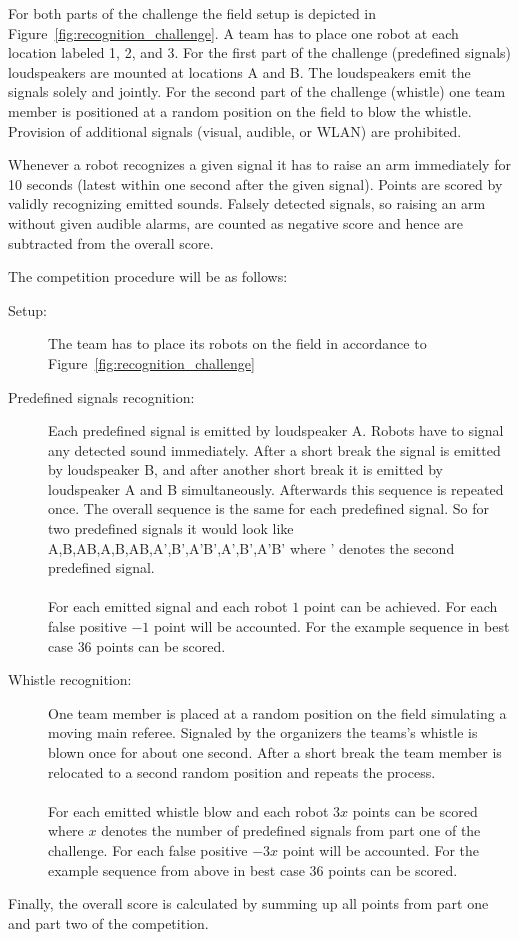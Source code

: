 \documentclass[12pt]{article}
\begin{document}
For both parts of the challenge the field setup is depicted in Figure~\ref{fig:recognition_challenge}. A team has to place one robot at each location labeled 1, 2, and 3. For the first part of the challenge (predefined signals) loudspeakers are mounted at locations A and B. The loudspeakers emit the signals solely and jointly. For the second part of the challenge (whistle) one team member is positioned at a random position on the field to blow the whistle. Provision of additional signals (visual, audible, or WLAN) are prohibited.

Whenever a robot recognizes a given signal it has to raise an arm immediately for 10 seconds (latest within one second after the given signal).
Points are scored by validly recognizing emitted sounds. Falsely detected signals, so raising an arm without given audible alarms, are counted as negative score and hence are subtracted from the overall score.

The competition procedure will be as follows:

\begin{description}
	\item[Setup:] The team has to place its robots on the field in accordance to Figure~\ref{fig:recognition_challenge}
	\item[Predefined signals recognition:] Each predefined signal is emitted by loudspeaker A. Robots have to signal any detected sound immediately. After a short break the signal is emitted by loudspeaker B, and after another short break it is emitted by loudspeaker A and B simultaneously. Afterwards this sequence is repeated once. The overall sequence is the same for each predefined signal. So for two predefined signals it would look like A,B,AB,A,B,AB,A',B',A'B',A',B',A'B' where ' denotes the second predefined signal.\\
	\\For each emitted signal and each robot $1$ point can be achieved. For each false positive $-1$ point will be accounted. For the example sequence in best case $36$ points can be scored.
	\item[Whistle recognition:] One team member is placed at a random position on the field simulating a moving main referee. Signaled by the organizers the teams's whistle is blown once for about one second. After a short break the team member is relocated to a second random position and repeats the process.\\
	\\ For each emitted whistle blow and each robot $3x$ points can be scored where $x$ denotes the number of predefined signals from part one of the challenge. For each false positive $-3x$ point will be accounted. For the example sequence from above in best case $36$ points can be scored.
\end{description}

Finally, the overall score is calculated by summing up all points from part one and part two of the competition.
\end{document}
